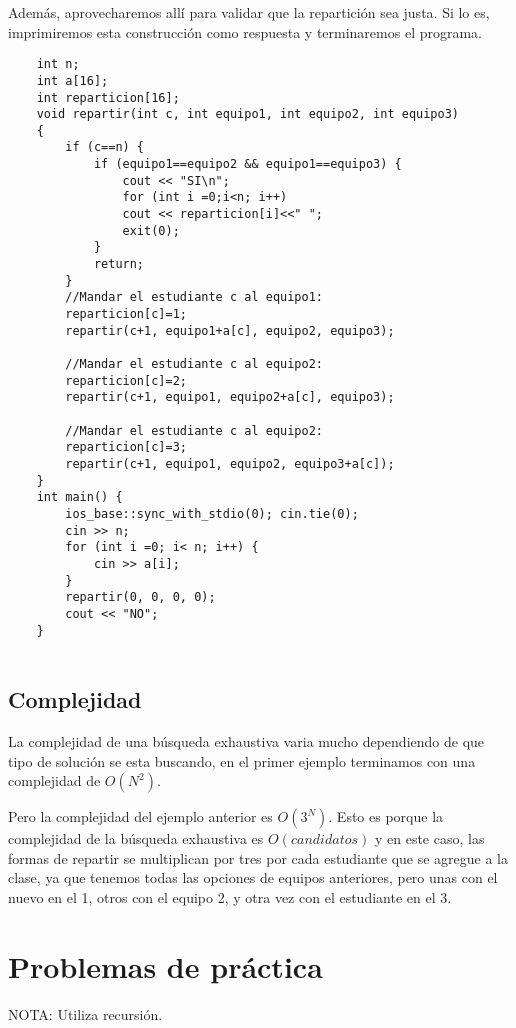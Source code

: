 Además, aprovecharemos allí para validar que la repartición sea justa. Si lo es, imprimiremos esta construcción como respuesta y terminaremos el programa.
\pagebreak
\begin{lstlisting}
	int n;
	int a[16];
	int reparticion[16];
	void repartir(int c, int equipo1, int equipo2, int equipo3) 
	{
		if (c==n) {
			if (equipo1==equipo2 && equipo1==equipo3) {
				cout << "SI\n";
				for (int i =0;i<n; i++) 
				cout << reparticion[i]<<" ";					
				exit(0);
			}
			return;
		}
		//Mandar el estudiante c al equipo1:
		reparticion[c]=1;
		repartir(c+1, equipo1+a[c], equipo2, equipo3);
		
		//Mandar el estudiante c al equipo2:
		reparticion[c]=2;
		repartir(c+1, equipo1, equipo2+a[c], equipo3);
		
		//Mandar el estudiante c al equipo2:
		reparticion[c]=3;
		repartir(c+1, equipo1, equipo2, equipo3+a[c]);
	}
	int main() {
		ios_base::sync_with_stdio(0); cin.tie(0);
		cin >> n;
		for (int i =0; i< n; i++) {
			cin >> a[i];
		}
		repartir(0, 0, 0, 0);
		cout << "NO";
	}
	
\end{lstlisting}

\subsection{Complejidad}

La complejidad de una búsqueda exhaustiva varia mucho dependiendo de que tipo de solución se esta buscando, en el primer ejemplo terminamos con una complejidad de \(O(N^2)\). 

Pero la complejidad del ejemplo anterior es \(O(3^N)\). Esto es porque la complejidad de la búsqueda exhaustiva es \(O(candidatos)\) y en este caso, las formas de repartir se multiplican por tres por cada estudiante que se agregue a la clase, ya que tenemos todas las opciones de equipos anteriores, pero unas con el nuevo en el 1, otros con el equipo 2, y otra vez con el estudiante en el 3.


\section*{Problemas de práctica}
\begin{exercise}

	NOTA: Utiliza recursión.
\end{exercise}

\begin{exercise}
\end{exercise}
\begin{exercise}
\end{exercise}

\begin{exercise}
\end{exercise}


